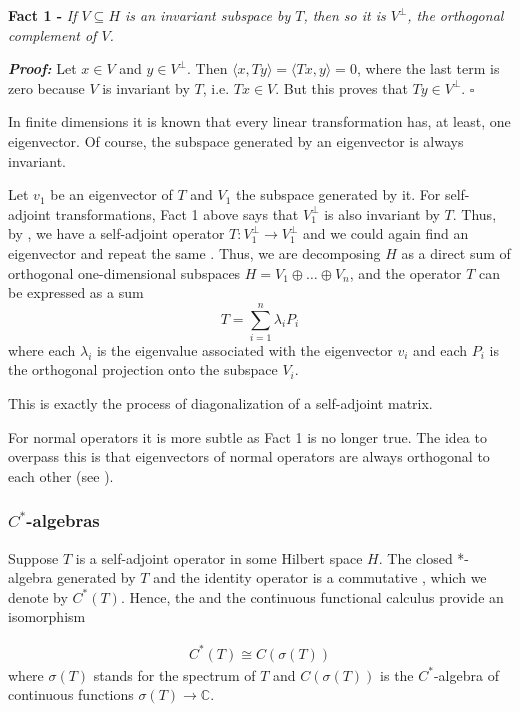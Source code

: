 \documentclass[12pt]{article}
\begin{document}
{\bf Fact 1 -} \emph{If $V \subseteq H$ is an invariant subspace by $T$, then so it is $V^{\perp}$, the orthogonal complement of $V$.}

{\bf \emph{Proof:}} Let $x \in V$ and $y \in V^{\perp}$. Then $\langle x, Ty\rangle = \langle Tx, y \rangle = 0$, where the last term is zero because $V$ is invariant by $T$, i.e. $Tx \in V$. But this proves that $Ty \in V^{\perp}$. $\square$ 

In finite dimensions it is known that every linear transformation has, at least, one eigenvector. Of course, the subspace generated by an eigenvector is always invariant.

Let $v_1$ be an eigenvector of $T$ and $V_1$ the subspace generated by it. For self-adjoint transformations, Fact 1 above says that $V_1^{\perp}$ is also invariant by $T$. Thus, by , we have a self-adjoint operator $T: V_1^{\perp} \longrightarrow V_1^{\perp}$ and we could again find an eigenvector and repeat the same . Thus, we are decomposing $H$ as a direct sum of orthogonal one-dimensional subspaces $H = V_1 \oplus \dots \oplus V_n$, and the operator $T$ can be expressed as a sum
\begin{displaymath}
T = \sum_{i =1}^n \lambda_i P_i
\end{displaymath}
where each $\lambda_i$ is the eigenvalue associated with the eigenvector $v_i$ and each $P_i$ is the orthogonal projection onto the subspace $V_i$.

This is exactly the process of diagonalization of a self-adjoint matrix.

For normal operators it is more subtle as Fact 1 is no longer true. The idea to overpass this is that eigenvectors of normal operators are always orthogonal to each other (see ).

\subsubsection{$C^*$-algebras}

Suppose $T$ is a self-adjoint operator in some Hilbert space $H$. The closed *-algebra generated by $T$ and the identity operator is a commutative , which we denote by $C^*(T)$. Hence, the  and the continuous functional calculus provide an isomorphism

\begin{align*}
C^*(T) \cong C(\sigma(T))
\end{align*}
where $\sigma(T)$ stands for the spectrum of $T$ and $C(\sigma(T))$ is the $C^*$-algebra of continuous functions $\sigma(T) \to \mathbb{C}$.
\end{document}
